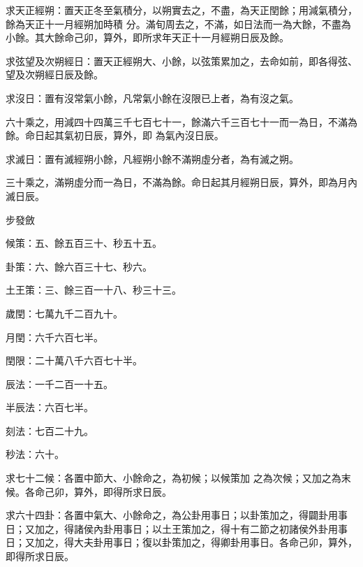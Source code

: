 \begin{pinyinscope}
 求天正經朔：置天正冬至氣積分，以朔實去之，不盡，為天正閏餘；用減氣積分，餘為天正十一月經朔加時積
 分。滿旬周去之，不滿，如日法而一為大餘，不盡為小餘。其大餘命己卯，算外，即所求年天正十一月經朔日辰及餘。



 求弦望及次朔經日：置天正經朔大、小餘，以弦策累加之，去命如前，即各得弦、望及次朔經日辰及餘。



 求沒日：置有沒常氣小餘，凡常氣小餘在沒限已上者，為有沒之氣。



 六十乘之，用減四十四萬三千七百七十一，餘滿六千三百七十一而一為日，不滿為餘。命日起其氣初日辰，算外，即
 為氣內沒日辰。



 求滅日：置有滅經朔小餘，凡經朔小餘不滿朔虛分者，為有滅之朔。



 三十乘之，滿朔虛分而一為日，不滿為餘。命日起其月經朔日辰，算外，即為月內滅日辰。



 步發斂



 候策：五、餘五百三十、秒五十五。



 卦策：六、餘六百三十七、秒六。



 土王策：三、餘三百一十八、秒三十三。



 歲閏：七萬九千二百九十。



 月閏：六千六百七半。



 閏限：二十萬八千六百七十半。



 辰法：一千二百一十五。



 半辰法：六百七半。



 刻法：七百二十九。



 秒法：六十。



 求七十二候：各置中節大、小餘命之，為初候；以候策加
 之為次候；又加之為末候。各命己卯，算外，即得所求日辰。



 求六十四卦：各置中氣大、小餘命之，為公卦用事日；以卦策加之，得闢卦用事日；又加之，得諸侯內卦用事日；以土王策加之，得十有二節之初諸侯外卦用事日；又加之，得大夫卦用事日；復以卦策加之，得卿卦用事日。各命己卯，算外，即得所求日辰。




\end{pinyinscope}
